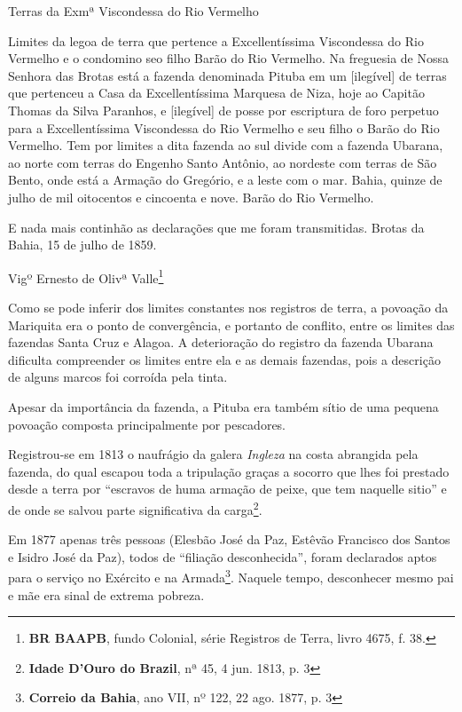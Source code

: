 \begin{citacao}
Terras da Exmª Viscondessa do Rio Vermelho

Limites da legoa de terra que pertence a Excellentíssima Viscondessa do Rio Vermelho e o condomino seo filho Barão do Rio Vermelho. Na freguesia de Nossa Senhora das Brotas está a fazenda denominada Pituba em um [ilegível] de terras que pertenceu a Casa da Excellentíssima Marquesa de Niza, hoje ao Capitão Thomas da Silva Paranhos, e [ilegível] de posse por escriptura de foro perpetuo para a Excellentíssima Viscondessa do Rio Vermelho e seu filho o Barão do Rio Vermelho. Tem por limites a dita fazenda ao sul divide com a fazenda Ubarana, ao norte com terras do Engenho Santo Antônio, ao nordeste com terras de São Bento, onde está a Armação do Gregório, e a leste com o mar. Bahia, quinze de julho de mil oitocentos e cincoenta e nove. Barão do Rio Vermelho.

E nada mais continhão as declarações que me foram transmitidas. Brotas da Bahia, 15 de julho de 1859.

Vigº Ernesto de Olivª Valle\footnote{\textbf{BR BAAPB}, fundo Colonial, série Registros de Terra, livro 4675, f. 38.}
\end{citacao}

Como se pode inferir dos limites constantes nos registros de terra, a povoação da Mariquita era o ponto de convergência, e portanto de conflito, entre os limites das fazendas Santa Cruz e Alagoa. A deterioração do registro da fazenda Ubarana dificulta compreender os limites entre ela e as demais fazendas, pois a descrição de alguns marcos foi corroída pela tinta.

Apesar da importância da fazenda, a Pituba era também sítio de uma pequena povoação composta principalmente por pescadores.

Registrou-se em 1813 o naufrágio da galera \textit{Ingleza} na costa abrangida pela fazenda, do qual escapou toda a tripulação graças a socorro que lhes foi prestado desde a terra por ``escravos de huma armação de peixe, que tem naquelle sitio'' e de onde se salvou parte significativa da carga\footnote{\textbf{Idade D'Ouro do Brazil}, nª 45, 4 jun. 1813, p. 3}.

Em 1877 apenas três pessoas (Elesbão José da Paz, Estêvão Francisco dos Santos e Isidro José da Paz), todos de ``filiação desconhecida'', foram declarados aptos para o serviço no Exército e na Armada\footnote{\textbf{Correio da Bahia}, ano VII, nº 122, 22 ago. 1877, p. 3}. Naquele tempo, desconhecer mesmo pai e mãe era sinal de extrema pobreza.

